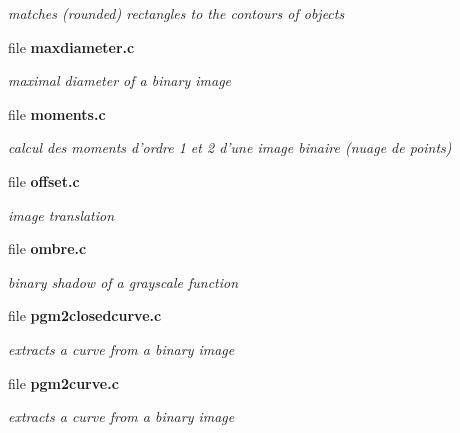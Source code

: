 \begin{DoxyCompactItemize}
\begin{DoxyCompactList}\small\item\em matches (rounded) rectangles to the contours of objects \item\end{DoxyCompactList}

\item 
file {\bf maxdiameter.c}


\begin{DoxyCompactList}\small\item\em maximal diameter of a binary image \item\end{DoxyCompactList}

\item 
file {\bf moments.c}


\begin{DoxyCompactList}\small\item\em calcul des moments d'ordre 1 et 2 d'une image binaire (nuage de points) \item\end{DoxyCompactList}

\item 
file {\bf offset.c}


\begin{DoxyCompactList}\small\item\em image translation \item\end{DoxyCompactList}

\item 
file {\bf ombre.c}


\begin{DoxyCompactList}\small\item\em binary shadow of a grayscale function \item\end{DoxyCompactList}

\item 
file {\bf pgm2closedcurve.c}


\begin{DoxyCompactList}\small\item\em extracts a curve from a binary image \item\end{DoxyCompactList}

\item 
file {\bf pgm2curve.c}


\begin{DoxyCompactList}\small\item\em extracts a curve from a binary image \item\end{DoxyCompactList}


\end{DoxyCompactItemize}
